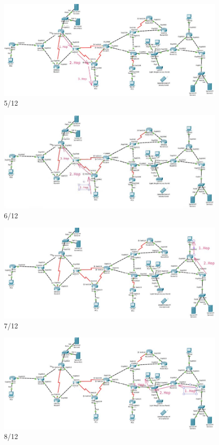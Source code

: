 \documentclass[a4paper]{article}
\begin{document}
\begin{figure}
	\centering
	\includegraphics[scale=0.5]{5.jpg}
	\caption{5/12}
\end{figure}
\begin{figure}
	\centering
	\includegraphics[scale=0.5]{6.jpg}
	\caption{6/12}
\end{figure}
\begin{figure}
	\centering
	\includegraphics[scale=0.5]{7.jpg}
	\caption{7/12}
\end{figure}
\begin{figure}
	\centering
	\includegraphics[scale=0.5]{8.jpg}
	\caption{8/12}
\end{figure}
\end{document}
